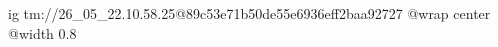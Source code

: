  
 
 
 
 

\qqSecOrig


\ifcmt
  ig tm://26_05_22.10.58.25@89c53e71b50de55e6936eff2baa92727
  @wrap center
  @width 0.8
\fi

